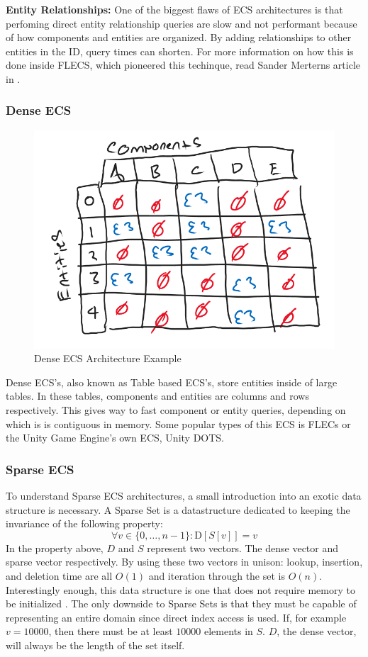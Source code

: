 \textbf{Entity Relationships:}
One of the biggest flaws of ECS architectures is that perfoming direct entity relationship queries are slow and not performant because of how components and entities are organized. By adding relationships to other entities in the ID, query times can shorten. For more information on how this is done inside FLECS, which pioneered this techinque, read Sander Merterns article in \cite{SanderMertensEntityIDs}.

\subsubsection{Dense ECS}
\begin{figure}[htbp]
    \centering
    \includegraphics[width=0.5\linewidth]{resources/dense_ecs.png}
    \caption{Dense ECS Architecture Example}
    \label{fig:dense_ecs}
\end{figure}

Dense ECS's, also known as Table based ECS's, store entities inside of large tables. In these tables, components and entities are columns and rows respectively. This gives way to fast component or entity queries, depending on which is is contiguous in memory. Some popular types of this ECS is FLECs or the Unity Game Engine's own ECS, Unity DOTS. \cite{SanderMertensFAQ}

\subsubsection{Sparse ECS}
To understand Sparse ECS architectures, a small introduction into an exotic data structure is necessary. A Sparse Set is a datastructure dedicated to keeping the invariance of the following property:
\begin{equation*}
    \forall v \in \{0,\ldots, n-1\} : \text{D}[S[v]] = v
\end{equation*}
In the property above, $D$ and $S$ represent two vectors. The dense vector and sparse vector respectively. By using these two vectors in unison: lookup, insertion, and deletion time are all $O(1)$ and iteration through the set is $O(n)$. Interestingly enough, this data structure is one that does not require memory to be initialized \cite{sparse_profit}. The only downside to Sparse Sets is that they must be capable of representing an entire domain since direct index access is used. If, for example $v = 10000$, then there must be at least $10000$ elements in $S$. $D$, the dense vector, will always be the length of the set itself.

